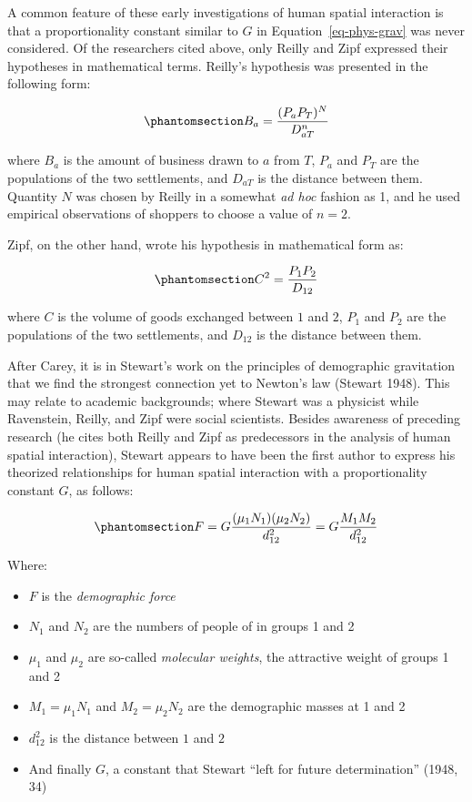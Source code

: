 \documentclass[
]{article}
\providecommand{\tightlist}{%
  \setlength{\itemsep}{0pt}\setlength{\parskip}{0pt}}\usepackage{longtable,booktabs,array}
\begin{document}
A common feature of these early investigations of human spatial
interaction is that a proportionality constant similar to \(G\) in
Equation~\ref{eq-phys-grav} was never considered. Of the researchers
cited above, only Reilly and Zipf expressed their hypotheses in
mathematical terms. Reilly's hypothesis was presented in the following
form:

\begin{equation}\phantomsection\label{eq-reilly}{
B_a = \frac{(P_a P_T)^N}{D_{aT}^n}
}\end{equation}

\noindent where \(B_a\) is the amount of business drawn to \(a\) from
\(T\), \(P_a\) and \(P_T\) are the populations of the two settlements,
and \(D_{aT}\) is the distance between them. Quantity \(N\) was chosen
by Reilly in a somewhat \emph{ad hoc} fashion as 1, and he used
empirical observations of shoppers to choose a value of \(n = 2\).

Zipf, on the other hand, wrote his hypothesis in mathematical form as:

\begin{equation}\phantomsection\label{eq-zipf}{
C^2 = \frac{P_1 P_2}{D_{12}}
}\end{equation}

\noindent where \(C\) is the volume of goods exchanged between \(1\) and
\(2\), \(P_1\) and \(P_2\) are the populations of the two settlements,
and \(D_{12}\) is the distance between them.

After Carey, it is in Stewart's work on the principles of demographic
gravitation that we find the strongest connection yet to Newton's law
(Stewart 1948). This may relate to academic backgrounds; where Stewart
was a physicist while Ravenstein, Reilly, and Zipf were social
scientists. Besides awareness of preceding research (he cites both
Reilly and Zipf as predecessors in the analysis of human spatial
interaction), Stewart appears to have been the first author to express
his theorized relationships for human spatial interaction with a
proportionality constant \(G\), as follows:

\begin{equation}\phantomsection\label{eq-stewart-force}{
F = G\frac{(\mu_1N_1)(\mu_2N_2)}{d_{12}^2} = G\frac{M_1 M_2}{d_{12}^2} 
}\end{equation}

\noindent Where:

\begin{itemize}
\tightlist
\item
  \(F\) is the \emph{demographic force}
\item
  \(N_1\) and \(N_2\) are the numbers of people of in groups 1 and 2
\item
  \(\mu_1\) and \(\mu_2\) are so-called \emph{molecular weights}, the
  attractive weight of groups 1 and 2
\item
  \(M_1 = \mu_1N_1\) and \(M_2 = \mu_2N_2\) are the demographic masses
  at 1 and 2
\item
  \(d_{12}^2\) is the distance between \(1\) and \(2\)
\item
  And finally \(G\), a constant that Stewart ``left for future
  determination'' (1948, 34)
\end{itemize}
\end{document}
